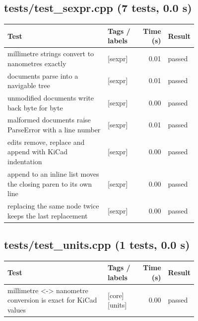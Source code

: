 \subsection*{tests/\allowbreak{}test\_\allowbreak{}sexpr.cpp (7 tests, 0.0 s)}
\begin{longtable}{@{}p{0.57\linewidth}p{0.19\linewidth}rl@{}}
\toprule Test & Tags / labels & Time (s) & Result \\ \midrule \endhead
millimetre strings convert to nanometres exactly & {\footnotesize [sexpr]} & 0.01 & passed \\
documents parse into a navigable tree & {\footnotesize [sexpr]} & 0.01 & passed \\
unmodified documents write back byte for byte & {\footnotesize [sexpr]} & 0.00 & passed \\
malformed documents raise ParseError with a line number & {\footnotesize [sexpr]} & 0.01 & passed \\
edits remove, replace and append with KiCad indentation & {\footnotesize [sexpr]} & 0.00 & passed \\
append to an inline list moves the closing paren to its own line & {\footnotesize [sexpr]} & 0.00 & passed \\
replacing the same node twice keeps the last replacement & {\footnotesize [sexpr]} & 0.00 & passed \\
\bottomrule\end{longtable}
\subsection*{tests/\allowbreak{}test\_\allowbreak{}units.cpp (1 tests, 0.0 s)}
\begin{longtable}{@{}p{0.57\linewidth}p{0.19\linewidth}rl@{}}
\toprule Test & Tags / labels & Time (s) & Result \\ \midrule \endhead
millimetre \textless{}-\textgreater{} nanometre conversion is exact for KiCad values & {\footnotesize [core][units]} & 0.00 & passed \\
\bottomrule\end{longtable}
